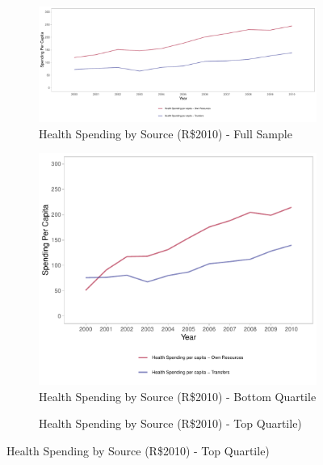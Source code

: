 \begin{figure}[h!]
    \begin{center}
    \caption{\footnotesize Health Spending Trends}\label{fig:3}
    \begin{subfigure}{.9\textwidth}
        \caption{\scriptsize Health Spending by Source (R\$2010) - Full Sample}\label{fig:3a}
        \centering
        \includegraphics[width=\textwidth]{plots/plot_siops_level_source.pdf}
    \end{subfigure}
        \begin{subfigure}{0.45\textwidth}
        \caption{\scriptsize Health Spending by Source (R\$2010) - Bottom Quartile}\label{fig:3b}
        \centering
        \includegraphics[width=\textwidth]{plots/plot_siops_level_source_bottom.pdf}
    \end{subfigure}
        \begin{subfigure}{0.45\textwidth}
        \caption{\scriptsize Health Spending by Source (R\$2010) - Top Quartile)}\label{fig:3c}

\end{subfigure}
\end{center}
\end{figure}
